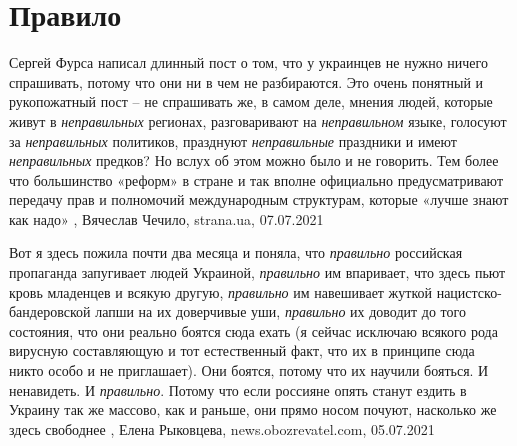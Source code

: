  
 
 
 
 
\chapter{Правило}
\label{sec:slova.pravilo}

Сергей Фурса написал длинный пост о том, что у украинцев не нужно ничего
спрашивать, потому что они ни в чем не разбираются. Это очень понятный и
рукопожатный пост – не спрашивать же, в самом деле, мнения людей, которые живут
в \emph{неправильных} регионах, разговаривают на \emph{неправильном} языке, голосуют за
\emph{неправильных} политиков, празднуют \emph{неправильные} праздники и имеют \emph{неправильных}
предков?  Но вслух об этом можно было и не говорить. Тем более что большинство
«реформ» в стране и так вполне официально предусматривают передачу прав и
полномочий международным структурам, которые «лучше знают как надо»
, Вячеслав Чечило, strana.ua, 07.07.2021

Вот я здесь пожила почти два месяца и поняла, что \emph{правильно} российская
пропаганда запугивает людей Украиной, \emph{правильно} им впаривает, что здесь пьют
кровь младенцев и всякую другую, \emph{правильно} им навешивает жуткой
нацистско-бандеровской лапши на их доверчивые уши, \emph{правильно} их доводит до того
состояния, что они реально боятся сюда ехать (я сейчас исключаю всякого рода
вирусную составляющую и тот естественный факт, что их в принципе сюда никто
особо и не приглашает).
Они боятся, потому что их научили бояться. И ненавидеть. И \emph{правильно}. Потому
что если россияне опять станут ездить в Украину так же массово, как и раньше,
они прямо носом почуют, насколько же здесь свободнее
, 
Елена Рыковцева, news.obozrevatel.com, 05.07.2021

